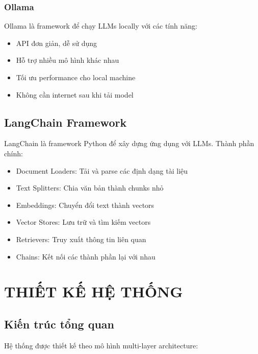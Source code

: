 \documentclass[12pt,a4paper]{report}
\begin{document}
\subsection{Ollama}

Ollama là framework để chạy LLMs locally với các tính năng:
\begin{itemize}
    \item API đơn giản, dễ sử dụng
    \item Hỗ trợ nhiều mô hình khác nhau
    \item Tối ưu performance cho local machine
    \item Không cần internet sau khi tải model
\end{itemize}

\section{LangChain Framework}

LangChain là framework Python để xây dựng ứng dụng với LLMs. Thành phần chính:
\begin{itemize}
    \item Document Loaders: Tải và parse các định dạng tài liệu
    \item Text Splitters: Chia văn bản thành chunks nhỏ
    \item Embeddings: Chuyển đổi text thành vectors
    \item Vector Stores: Lưu trữ và tìm kiếm vectors
    \item Retrievers: Truy xuất thông tin liên quan
    \item Chains: Kết nối các thành phần lại với nhau
\end{itemize}

\newpage

\chapter{THIẾT KẾ HỆ THỐNG}

\section{Kiến trúc tổng quan}

Hệ thống được thiết kế theo mô hình multi-layer architecture:
\end{document}
